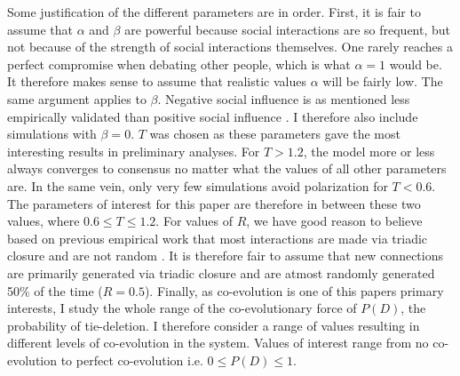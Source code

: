 \documentclass{article}
\begin{document}
\noindent Some justification of the different parameters are in order. 
First, it is fair to assume that $\alpha$ and $\beta$ are powerful because social interactions are so frequent, but not because of the strength of social interactions themselves.
One rarely reaches a perfect compromise when debating other people, which is what $\alpha = 1$ would be. It therefore makes sense to assume that realistic values $\alpha$ will be fairly low. 
The same argument applies to $\beta$. Negative social influence is as mentioned less empirically validated than positive social influence \cite{takacs_is_2014}. I therefore also include simulations with $\beta = 0$. 
$T$ was chosen as these parameters gave the most interesting results in preliminary analyses. For $T > 1.2$, the model more or less always converges to consensus no matter what the values of all other parameters are. In the same vein, only very few simulations avoid polarization for $T < 0.6$. The parameters of interest for this paper are therefore in between these two values, where $0.6 \leq T \leq 1.2$. 
For values of $R$, we have good reason to believe based on previous empirical work that most interactions are made via triadic closure and are not random \cite{kossinets_origins_2009}. It is therefore fair to assume that new connections are primarily generated via triadic closure and are atmost randomly generated 50\% of the time ($R = 0.5$).
Finally, as co-evolution is one of this papers primary interests, I study the whole range of the co-evolutionary force of $P(D)$, the probability of tie-deletion. I therefore consider a range of values resulting in different levels of co-evolution in the system. Values of interest range from no co-evolution to perfect co-evolution i.e. $0 \leq P(D) \leq 1$.
\end{document}
